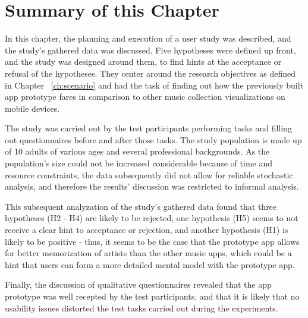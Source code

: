 \section{Summary of this Chapter}

In this chapter, the planning and execution of a user study was described, and the study's gathered data was discussed. Five hypotheses were defined up front, and the study was designed around them, to find hints at the acceptance or refusal of the hypotheses. They center around the research objectives as defined in Chapter ~\ref{ch:scenario} and had the task of finding out how the previously built app prototype fares in comparison to other music collection visualizations on mobile devices. 

The study was carried out by the test participants performing tasks and filling out questionnaires before and after those tasks. The study population is made up of 10 adults of various ages and several professional backgrounds. As the population's size could not be increased considerable because of time and resource constraints, the data subsequently did not allow for reliable stochastic analysis, and therefore the results' discussion was restricted to informal analysis.

This subsequent analyzation of the study's gathered data found that three hypotheses (H2 - H4) are likely to be rejected, one hypothesis (H5) seems to not receive a clear hint to acceptance or rejection, and another hypothesis (H1) is likely to be positive - thus, it seems to be the case that the prototype app allows for better memorization of artists than the other music apps, which could be a hint that users can form a more detailed mental model with the prototype app.

Finally, the discussion of qualitative questionnaires revealed that the app prototype was well recepted by the test participants, and that it is likely that no usability issues distorted the test tasks carried out during the experiments.